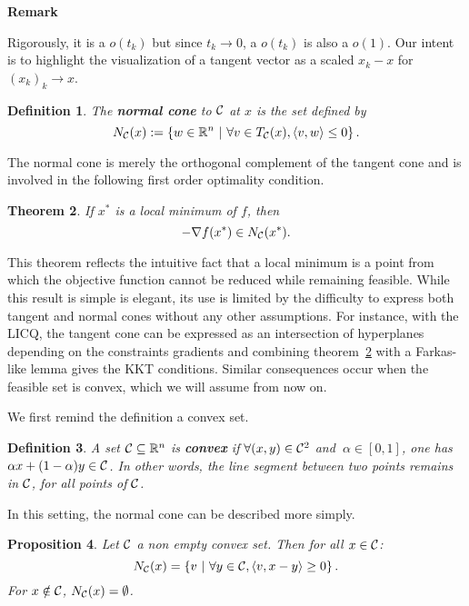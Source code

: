 \documentclass[10pt]{article}
\newtheorem{theorem}{Theorem}[]
\newtheorem{definition}[theorem]{Definition}
\newtheorem{proposition}[theorem]{Proposition}
\numberwithin{equation}{section}
\begin{document}
	\textbf{Remark} 
	
	Rigorously, it is a $o(t_k)$ but since $t_k \to 0$, a $o(t_k)$ is also a $o(1)$. Our intent is to highlight the  visualization of a tangent vector as a scaled $x_k-x$ for $(x_k)_k \to x$.
	
	\begin{definition}
		
		The \textbf{normal cone} to ${\mathcal{C}}$ at $x$ is the set defined by
		\[N_{\mathcal{C}} (x) := \left\{w \in {\mathbb{R}}^n\ | \ \forall v \in T_{\mathcal{C}}(x), \left\langle {v} , {w} \right\rangle \le 0\right\}.\]
	\end{definition}
	
	The normal cone is merely the orthogonal complement of the tangent cone and is involved in the following first order optimality condition.
	
	\begin{theorem}\label{theo:first_order_normal_cone}
		If $x^*$ is a local minimum of $f$, then \[-\nabla f(x^*) \in N_{\mathcal{C}}(x^*).\]
	\end{theorem}
	
	This theorem reflects the intuitive fact that a local minimum is a point from which the objective function cannot be reduced while remaining feasible. While this result is simple is elegant, its use is limited by the difficulty to express both tangent and normal cones without any other assumptions. For instance, with the LICQ, the tangent cone can be expressed as an intersection of hyperplanes depending on the constraints gradients and combining theorem~\ref{theo:first_order_normal_cone} with a Farkas-like lemma gives the KKT conditions. Similar consequences occur when the feasible set is convex, which we will assume from now on.
	
	We first remind the definition a convex set.
	
	\begin{definition}
		A set ${\mathcal{C}}\subseteq {\mathbb{R}}^n$ is \textbf{convex} if \(\forall (x,y) \in {\mathcal{C}}^2\) and \(\ \alpha \in [0,1] \), one has \(\alpha x+ (1-\alpha)y \in {\mathcal{C}}\).
		In other words, the line segment between two points remains in ${\mathcal{C}}$, for all points of ${\mathcal{C}}$.
	\end{definition}
	
	In this setting, the normal cone can be described more simply.
	
	\begin{proposition}\label{prop:normal_set_convex}
		Let ${\mathcal{C}} $ a non empty convex set. Then for all $x \in {\mathcal{C}}$:
		\[N_{\mathcal{C}} (x) = \left\{v \ | \ \forall y \in {\mathcal{C}}, \left\langle {v} , {x-y} \right\rangle \ge 0\right\}.\]
		For $x \notin {\mathcal{C}}$, $N_{\mathcal{C}} (x) = \emptyset$.
	\end{proposition}
	
\end{document}
